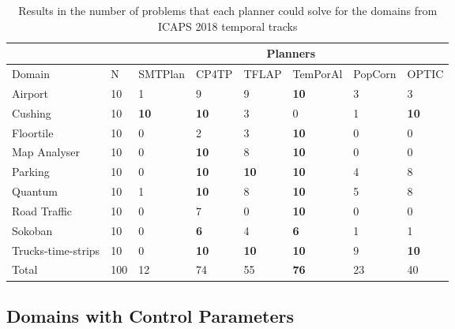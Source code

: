 \begin{table}[thb]
\centering
\begin{tabular}{|l|l|l|l|l|l|l|l|}

\hline
                   &     & \multicolumn{6}{c|}{Planners}                                                 \\ \hline
Domain             & N   & SMTPlan     & CP4TP       & TFLAP       & TemPorAl    & PopCorn & OPTIC       \\ \hline
Airport            & 10  & 1           & 9           & 9           & \textbf{10} & 3       & 3           \\ \hline
Cushing            & 10  & \textbf{10} & \textbf{10} & 3           & 0           & 1       & \textbf{10} \\ \hline
Floortile          & 10  & 0           & 2           & 3           & \textbf{10} & 0       & 0           \\ \hline
Map Analyser       & 10  & 0            & \textbf{10} & 8           & \textbf{10} & 0       & 0           \\ \hline
Parking            & 10  & 0           & \textbf{10} & \textbf{10} & \textbf{10} & 4       & 8           \\ \hline
Quantum            & 10  & 1           & \textbf{10} & 8           & \textbf{10} & 5       & 8           \\ \hline
Road Traffic       & 10  & 0           & 7           & 0           & \textbf{10} & 0       & 0           \\ \hline
Sokoban            & 10  & 0           & \textbf{6}  & 4           & \textbf{6}  & 1       & 1           \\ \hline
Trucks-time-strips & 10  & 0           & \textbf{10} & \textbf{10} & \textbf{10} & 9       & \textbf{10} \\ \hline
Total              & 100 & 12          & 74          & 55          & \textbf{76} & 23      & 40          \\ \hline
\end{tabular}
\caption{Results in the number of problems that each planner could solve for the domains from ICAPS 2018 temporal tracks}
\label{tab:ipc result}
\end{table}

\subsection{Domains with Control Parameters}\label{sec:eval_cp}

